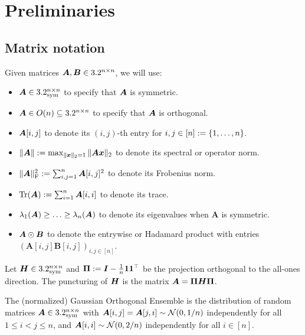 \newpage
\section{Preliminaries}
\label{sec:prelims}

\subsection{Matrix notation}

Given matrices
${\bm A}, {\bm B} \in 3.2^{n\times n}$, we will use:
\begin{itemize}
    \item ${\bm A} \in 3.2^{n\times n}_{\mathrm{sym}}$ to
    specify that ${\bm A}$ is symmetric.
    \item ${\bm A} \in O(n) \subseteq 3.2^{n \times n}$ to specify that ${\bm A}$ is orthogonal.
    \item ${\bm A}[i,j]$ to denote its $(i,j)$-th
    entry for $i,j\in [n] := \{1,\ldots,n\}$.
    \item $\|{\bm A}\| := \max_{\|\bm x\|_2=1} \|{\bm A} \bm x\|_2$ to denote its spectral or operator
    norm.
    \item $\|{\bm A}\|^2_{\textnormal{F}} := \sum_{i,j=1}^n {\bm A}[i,j]^2$ to denote its
    Frobenius norm.
    \item $\Tr(\bm A) := \sum_{i=1}^n \bm A[i,i]$ to denote its trace.
    \item $\lambda_1({\bm A})\ge \ldots \ge \lambda_n({\bm A})$ to
    denote its eigenvalues when $\bm A$ is symmetric.
    \item ${\bm A} \odot {\bm B}$ to denote the entrywise or Hadamard product with entries $(\bm A[i,j]\bm B[i,j])_{i,j\in [n]}$.
\end{itemize}

\begin{definition}[Puncturing]\label{def:puncturing}
    Let ${\bm H}\in 3.2_{\mathrm{sym}}^{n\times n}$ and $\bm \Pi := \bm I - \frac 1n \bm 1 \bm 1^\top$ be
    the projection orthogonal to the all-ones
    direction. The {puncturing} of ${\bm H}$ is
    the matrix ${\bm A} = \bm \Pi {\bm H} \bm \Pi$.
\end{definition}

\begin{definition}[\goe]
\label{def:goe}
    The (normalized) {Gaussian Orthogonal Ensemble} \goe
    is the distribution of random matrices ${\bm A}\in3.2_{\mathrm{sym}}^{n\times n}$
    with ${\bm A}[i,j]={\bm A}[j,i]\sim {\cal N}(0,1/n)$ independently for all $1\le i<j\le n$, and
    ${\bm A}[i, i]\sim {\cal N}(0,2/n)$ independently
    for all $i\in [n]$.
\end{definition}

